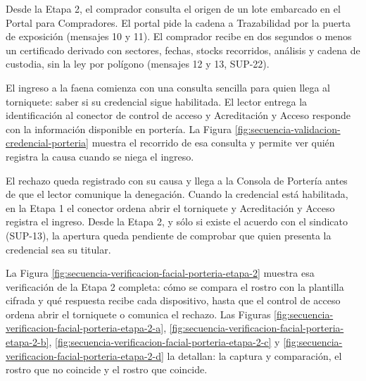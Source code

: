 \documentclass[subdoc]{../../comun/overfore}
\begin{document}
Desde la Etapa 2, el comprador consulta el origen de un lote embarcado en el Portal para Compradores. El portal pide la cadena a Trazabilidad por la puerta de exposición (mensajes 10 y 11). El comprador recibe en dos segundos o menos un certificado derivado con sectores, fechas, stocks recorridos, análisis y cadena de custodia, sin la ley por polígono (mensajes 12 y 13, SUP-22).

El ingreso a la faena comienza con una consulta sencilla para quien llega al torniquete: saber si su credencial sigue habilitada. El lector entrega la identificación al conector de control de acceso y Acreditación y Acceso responde con la información disponible en portería. La Figura \ref{fig:secuencia-validacion-credencial-porteria} muestra el recorrido de esa consulta y permite ver quién registra la causa cuando se niega el ingreso.

\begin{horizontal}
\end{horizontal}
El rechazo queda registrado con su causa y llega a la Consola de Portería antes de que el lector comunique la denegación. Cuando la credencial está habilitada, en la Etapa 1 el conector ordena abrir el torniquete y Acreditación y Acceso registra el ingreso. Desde la Etapa 2, y sólo si existe el acuerdo con el sindicato (SUP-13), la apertura queda pendiente de comprobar que quien presenta la credencial sea su titular.

La Figura \ref{fig:secuencia-verificacion-facial-porteria-etapa-2} muestra esa verificación de la Etapa 2 completa: cómo se compara el rostro con la plantilla cifrada y qué respuesta recibe cada dispositivo, hasta que el control de acceso ordena abrir el torniquete o comunica el rechazo. Las Figuras \ref{fig:secuencia-verificacion-facial-porteria-etapa-2-a}, \ref{fig:secuencia-verificacion-facial-porteria-etapa-2-b}, \ref{fig:secuencia-verificacion-facial-porteria-etapa-2-c} y \ref{fig:secuencia-verificacion-facial-porteria-etapa-2-d} la detallan: la captura y comparación, el rostro que no coincide y el rostro que coincide.
\end{document}

